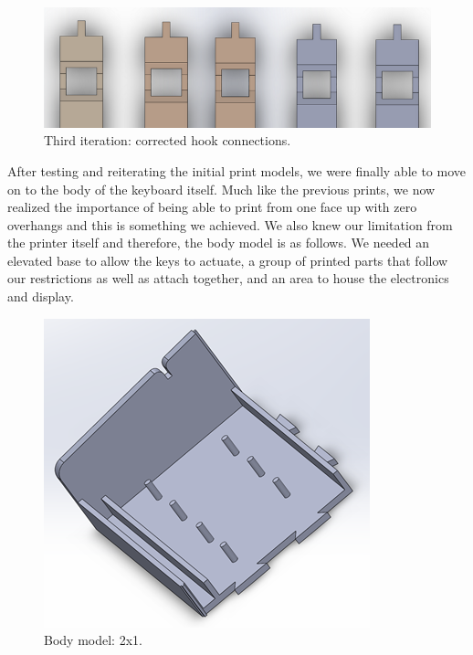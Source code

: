 \begin{figure}[h!]
  \centering
  \includegraphics[width=0.8\linewidth]{image/KeyModels.png}
  \caption{Third iteration: corrected hook connections.}
  \label{fig:key_models}
\end{figure}

After testing and reiterating the initial print models, we were finally able to move on to the body of the keyboard itself. Much like the previous prints, we now realized the importance of being able to print from one face up with zero overhangs and this is something we achieved. We also knew our limitation from the printer itself and therefore, the body model is as follows. We needed an elevated base to allow the keys to actuate, a group of printed parts that follow our restrictions as well as attach together, and an area to house the electronics and display.

\begin{figure}[h!]
  \centering
  \includegraphics[width=0.8\linewidth]{image/BodyModel1.png}
  \caption{Body model: 2x1.}
  \label{fig:body_model1}
\end{figure}

